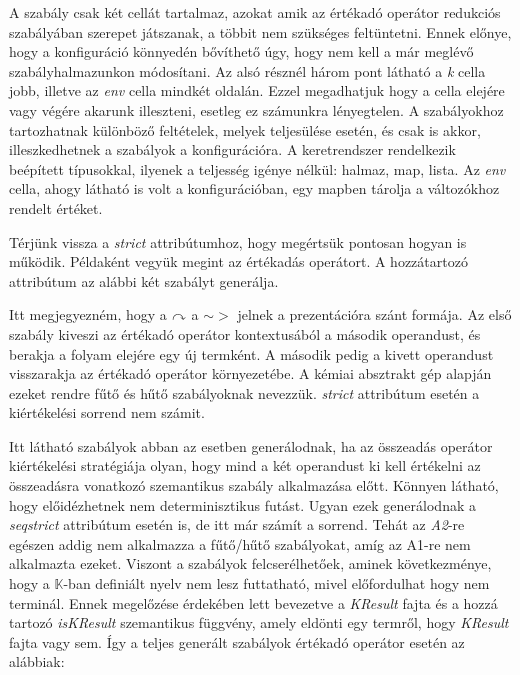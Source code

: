 A szabály csak két cellát tartalmaz, azokat amik az értékadó operátor redukciós szabályában szerepet játszanak, a többit nem szükséges feltüntetni. Ennek előnye, hogy a konfiguráció könnyedén bővíthető úgy, hogy nem kell a már meglévő szabályhalmazunkon módosítani. Az alsó résznél három pont látható a \textit{k} cella jobb, illetve az \textit{env} cella mindkét oldalán. Ezzel megadhatjuk hogy a cella elejére vagy végére akarunk illeszteni, esetleg ez számunkra lényegtelen. A szabályokhoz tartozhatnak különböző feltételek, melyek teljesülése esetén, és csak is akkor, illeszkedhetnek a szabályok a konfigurációra. A keretrendszer rendelkezik beépített típusokkal, ilyenek a teljesség igénye nélkül: halmaz, map, lista. Az \textit{env} cella, ahogy látható is volt a konfigurációban, egy mapben tárolja a változókhoz rendelt értéket.

Térjünk vissza a \textit{strict} attribútumhoz, hogy megértsük pontosan hogyan is működik. Példaként vegyük megint az értékadás operátort. A hozzátartozó attribútum az alábbi két szabályt generálja.



Itt megjegyezném, hogy a $\curvearrowright$ a $\sim>$ jelnek a prezentációra szánt formája. Az első szabály kiveszi az értékadó operátor kontextusából a második operandust, és berakja a folyam elejére egy új termként. A második pedig a kivett operandust visszarakja az értékadó operátor környezetébe. A kémiai absztrakt gép alapján ezeket rendre fűtő és hűtő szabályoknak nevezzük. \textit{strict} attribútum esetén a kiértékelési sorrend nem számit.



Itt látható szabályok abban az esetben generálodnak, ha az összeadás operátor kiértékelési stratégiája olyan, hogy mind a két operandust ki kell értékelni az összeadásra vonatkozó szemantikus szabály alkalmazása előtt. Könnyen látható, hogy előidézhetnek nem determinisztikus futást. Ugyan ezek generálodnak a \textit{seqstrict} attribútum esetén is, de itt már számít a sorrend. Tehát az \textit{A2}-re egészen addig nem alkalmazza a fűtő/hűtő szabályokat, amíg az A1-re nem alkalmazta ezeket. Viszont a szabályok felcserélhetőek, aminek következménye, hogy a $\mathbb{K}$-ban definiált nyelv nem lesz futtatható, mivel előfordulhat hogy nem terminál. Ennek megelőzése érdekében lett bevezetve a \textit{KResult} fajta és a hozzá tartozó \textit{isKResult} szemantikus függvény, amely eldönti egy termről, hogy \textit{KResult} fajta vagy sem. Így a teljes generált szabályok értékadó operátor esetén az alábbiak:

